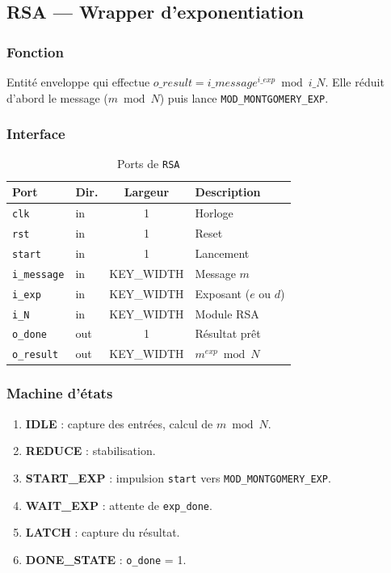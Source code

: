 \subsection{RSA --- Wrapper d'exponentiation}
\label{sec:rsa}

\subsubsection{Fonction}
Entité enveloppe qui effectue $o\_result = i\_message^{i\_exp} \bmod i\_N$.
Elle réduit d'abord le message ($m \bmod N$) puis lance
\texttt{MOD\_MONTGOMERY\_EXP}.

\subsubsection{Interface}
\begin{table}[H]
\centering
\caption{Ports de \texttt{RSA}}
\begin{tabular}{llcp{5cm}}
\toprule
\textbf{Port} & \textbf{Dir.} & \textbf{Largeur} & \textbf{Description} \\
\midrule
\texttt{clk}       & in  & 1 & Horloge \\
\texttt{rst}       & in  & 1 & Reset \\
\texttt{start}     & in  & 1 & Lancement \\
\texttt{i\_message} & in  & KEY\_WIDTH & Message $m$ \\
\texttt{i\_exp}     & in  & KEY\_WIDTH & Exposant ($e$ ou $d$) \\
\texttt{i\_N}       & in  & KEY\_WIDTH & Module RSA \\
\texttt{o\_done}    & out & 1 & Résultat prêt \\
\texttt{o\_result}  & out & KEY\_WIDTH & $m^{exp} \bmod N$ \\
\bottomrule
\end{tabular}
\end{table}

\subsubsection{Machine d'états}
\begin{enumerate}
  \item \textbf{IDLE} : capture des entrées, calcul de $m \bmod N$.
  \item \textbf{REDUCE} : stabilisation.
  \item \textbf{START\_EXP} : impulsion \texttt{start} vers
        \texttt{MOD\_MONTGOMERY\_EXP}.
  \item \textbf{WAIT\_EXP} : attente de \texttt{exp\_done}.
  \item \textbf{LATCH} : capture du résultat.
  \item \textbf{DONE\_STATE} : \texttt{o\_done} = 1.
\end{enumerate}

